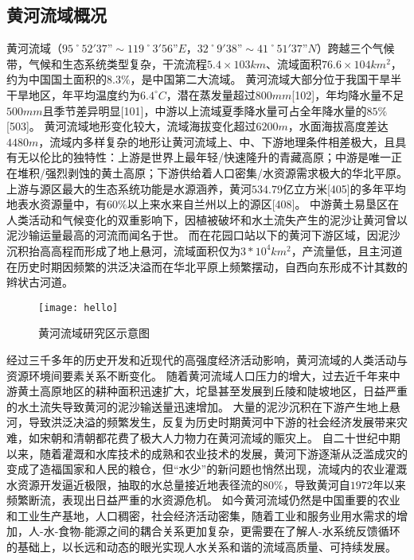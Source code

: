 \subsection{黄河流域概况}

黄河流域（$95˚52'37” \sim 119˚3'56”E$，$32˚9'38” \sim 41˚51'37”N$）跨越三个气候带，气候和生态系统类型复杂，干流流程$5.4 \times 103km$、流域面积$76.6 \times 104km^2$，约为中国国土面积的$8.3\%$，是中国第二大流域。
黄河流域大部分位于我国干旱半干旱地区，年平均温度约为$6.4^{\circ}C$，潜在蒸发量超过$800mm$[102]，年均降水量不足$500mm$且季节差异明显[101]，中游以上流域夏季降水量可占全年降水量的$85\%$[503]。
黄河流域地形变化较大，流域海拔变化超过$6200m$，水面海拔高度差达$4480m$，流域内多样复杂的地形让黄河流域上、中、下游地理条件相差极大，且具有无以伦比的独特性：上游是世界上最年轻/快速隆升的青藏高原；中游是唯一正在堆积/强烈剥蚀的黄土高原；下游供给着人口密集/水资源需求极大的华北平原。
上游与源区最大的生态系统功能是水源涵养，黄河$534.79$亿立方米[405]的多年平均地表水资源量中，有$60\%$以上来水来自兰州以上的源区[408]。
中游黄土易垦区在人类活动和气候变化的双重影响下，因植被破坏和水土流失产生的泥沙让黄河曾以泥沙输运量最高的河流而闻名于世\cite{best2019}。
而在花园口站以下的黄河下游区域，因泥沙沉积抬高高程而形成了地上悬河，流域面积仅为$3*10^4 km^2$，产流量低，且主河道在历史时期因频繁的洪泛决溢而在华北平原上频繁摆动，自西向东形成不计其数的辫状古河道。

\begin{figure}[htb] %
    \texttt{[image: hello]}
    \caption{黄河流域研究区示意图}\label{ch1:fig:study_area}
\end{figure}

经过三千多年的历史开发和近现代的高强度经济活动影响，黄河流域的人类活动与资源环境间要素关系不断变化\cite{fu2021a}。
随着黄河流域人口压力的增大，过去近千年来中游黄土高原地区的耕种面积迅速扩大，坨垦甚至发展到丘陵和陡坡地区，日益严重的水土流失导致黄河的泥沙输送量迅速增加\cite{wu2020a}。
大量的泥沙沉积在下游产生地上悬河，导致洪泛决溢的频繁发生，反复为历史时期黄河中下游的社会经济发展带来灾难，如宋朝和清朝都花费了极大人力物力在黄河流域的赈灾上。
自二十世纪中期以来，随着灌溉和水库技术的成熟和农业技术的发展，黄河下游逐渐从泛滥成灾的变成了造福国家和人民的粮仓，但“水少”的新问题也悄然出现，流域内的农业灌溉水资源开发逼近极限，抽取的水总量接近地表径流的$80\%$，导致黄河自$1972$年以来频繁断流，表现出日益严重的水资源危机。
如今黄河流域仍然是中国重要的农业和工业生产基地，人口稠密，社会经济活动密集，随着工业和服务业用水需求的增加，人-水-食物-能源之间的耦合关系更加复杂，更需要在了解人-水系统反馈循环的基础上，以长远和动态的眼光实现人水关系和谐的流域高质量、可持续发展。

